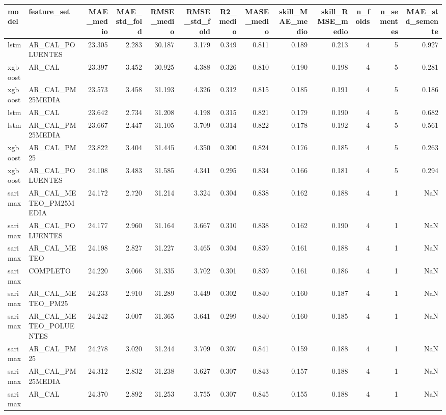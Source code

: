 \begin{tabular}{llrrrrrrrrrrr}
\toprule
model & feature_set & MAE_medio & MAE_std_fold & RMSE_medio & RMSE_std_fold & R2_medio & MASE_medio & skill_MAE_medio & skill_RMSE_medio & n_folds & n_sementes & MAE_std_semente \\
\midrule
lstm & AR_CAL_POLUENTES & 23.305 & 2.283 & 30.187 & 3.179 & 0.349 & 0.811 & 0.189 & 0.213 & 4 & 5 & 0.927 \\
xgboost & AR_CAL & 23.397 & 3.452 & 30.925 & 4.388 & 0.326 & 0.810 & 0.190 & 0.198 & 4 & 5 & 0.281 \\
xgboost & AR_CAL_PM25MEDIA & 23.573 & 3.458 & 31.193 & 4.326 & 0.312 & 0.815 & 0.185 & 0.191 & 4 & 5 & 0.186 \\
lstm & AR_CAL & 23.642 & 2.734 & 31.208 & 4.198 & 0.315 & 0.821 & 0.179 & 0.190 & 4 & 5 & 0.682 \\
lstm & AR_CAL_PM25MEDIA & 23.667 & 2.447 & 31.105 & 3.709 & 0.314 & 0.822 & 0.178 & 0.192 & 4 & 5 & 0.561 \\
xgboost & AR_CAL_PM25 & 23.822 & 3.404 & 31.445 & 4.350 & 0.300 & 0.824 & 0.176 & 0.185 & 4 & 5 & 0.263 \\
xgboost & AR_CAL_POLUENTES & 24.108 & 3.483 & 31.585 & 4.341 & 0.295 & 0.834 & 0.166 & 0.181 & 4 & 5 & 0.294 \\
sarimax & AR_CAL_METEO_PM25MEDIA & 24.172 & 2.720 & 31.214 & 3.324 & 0.304 & 0.838 & 0.162 & 0.188 & 4 & 1 & NaN \\
sarimax & AR_CAL_POLUENTES & 24.177 & 2.960 & 31.164 & 3.667 & 0.310 & 0.838 & 0.162 & 0.190 & 4 & 1 & NaN \\
sarimax & AR_CAL_METEO & 24.198 & 2.827 & 31.227 & 3.465 & 0.304 & 0.839 & 0.161 & 0.188 & 4 & 1 & NaN \\
sarimax & COMPLETO & 24.220 & 3.066 & 31.335 & 3.702 & 0.301 & 0.839 & 0.161 & 0.186 & 4 & 1 & NaN \\
sarimax & AR_CAL_METEO_PM25 & 24.233 & 2.910 & 31.289 & 3.449 & 0.302 & 0.840 & 0.160 & 0.187 & 4 & 1 & NaN \\
sarimax & AR_CAL_METEO_POLUENTES & 24.242 & 3.007 & 31.365 & 3.641 & 0.299 & 0.840 & 0.160 & 0.185 & 4 & 1 & NaN \\
sarimax & AR_CAL_PM25 & 24.278 & 3.020 & 31.244 & 3.709 & 0.307 & 0.841 & 0.159 & 0.188 & 4 & 1 & NaN \\
sarimax & AR_CAL_PM25MEDIA & 24.312 & 2.832 & 31.238 & 3.627 & 0.307 & 0.843 & 0.157 & 0.188 & 4 & 1 & NaN \\
sarimax & AR_CAL & 24.370 & 2.892 & 31.253 & 3.755 & 0.307 & 0.845 & 0.155 & 0.188 & 4 & 1 & NaN \\

\end{tabular}
